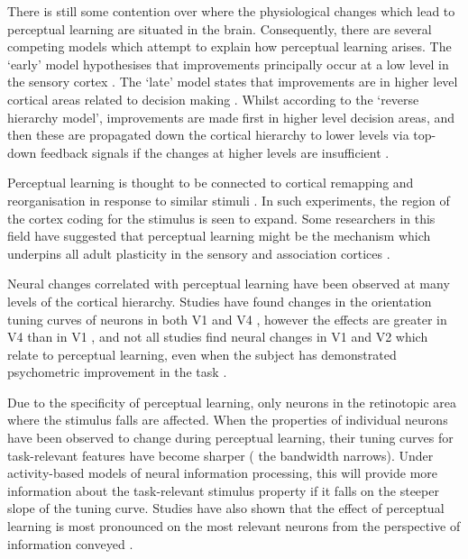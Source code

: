 There is still some contention over where the physiological changes which lead to perceptual learning are situated in the brain. Consequently, there are several competing models which attempt to explain how perceptual learning arises.
The `early' model hypothesises that improvements principally occur at a low level in the sensory cortex \cite{Gilbert2001,Fahle2005}.
The `late' model states that improvements are in higher level cortical areas related to decision making \cite{Yu2004}.
Whilst according to the `reverse hierarchy model', improvements are made first in higher level decision areas, and then these are propagated down the cortical hierarchy to lower levels via top-down feedback signals if the changes at higher levels are insufficient \cite{Ahissar2004,Hochstein2002}.

Perceptual learning is thought to be connected to cortical remapping and reorganisation in response to similar stimuli \cite{Dinse2003,Pleger2003,Polley2006}. In such experiments, the region of the cortex coding for the stimulus is seen to expand.
Some researchers in this field have suggested that perceptual learning might be the mechanism which underpins all adult plasticity in the sensory and association cortices \cite{Gilbert2001}.


Neural changes correlated with perceptual learning have been observed at many levels of the cortical hierarchy. Studies have found changes in the orientation tuning curves of neurons in both V1 \cite{Schoups2001} and V4 \cite{Yang2004,Raiguel2006}, however the effects are greater in V4 than in V1 \cite{Raiguel2006}, and not all studies find neural changes in V1 and V2 which relate to perceptual learning, even when the subject has demonstrated psychometric improvement in the task \cite{Ghose2002}.

Due to the specificity of perceptual learning, only neurons in the retinotopic area where the stimulus falls are affected. 
When the properties of individual neurons have been observed to change during perceptual learning, their tuning curves for task-relevant features have become sharper (\ie{} the bandwidth narrows). Under activity-based models of neural information processing, this will provide more information about the task-relevant stimulus property if it falls on the steeper slope of the tuning curve. Studies have also shown that the effect of perceptual learning is most pronounced on the most relevant neurons from the perspective of information conveyed \cite{Raiguel2006}. 


